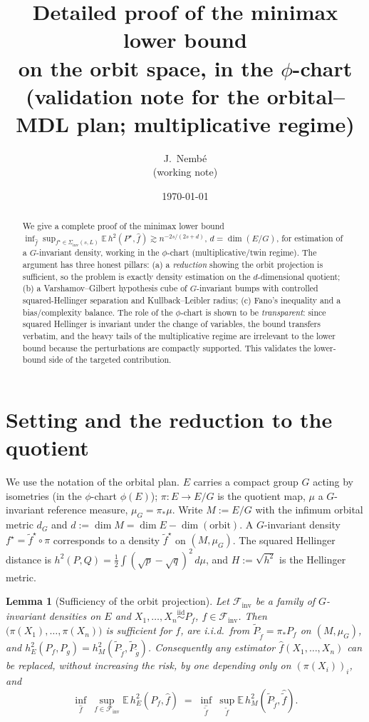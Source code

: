 \documentclass[11pt]{article}
\title{\textbf{Detailed proof of the minimax lower bound\\
on the orbit space, in the $\phi$-chart}\\[0.3em]
\large (validation note for the orbital--MDL plan; multiplicative regime)}
\author{J.~Nemb\'e \\ \small (working note)}
\date{\today}
\theoremstyle{plain}
\newtheorem{lemma}[theorem]{Lemma}
\theoremstyle{definition}
\theoremstyle{remark}
\newcommand{\E}{\mathbb{E}}
\DeclareMathOperator{\dimm}{dim}
\begin{document}
\maketitle

\begin{abstract}
We give a complete proof of the minimax lower bound
$\inf_{\widehat f}\sup_{f^\star\in\Sigma_{\mathrm{inv}}(s,L)}\E\,h^2(P^\star,\widehat f)
\gtrsim n^{-2s/(2s+d)}$, $d=\dimm(E/G)$, for estimation of a $G$-invariant
density, working in the $\phi$-chart (multiplicative/twin regime). The argument
has three honest pillars: (a) a \emph{reduction} showing the orbit projection is
sufficient, so the problem is exactly density estimation on the $d$-dimensional
quotient; (b) a Varshamov--Gilbert hypothesis cube of $G$-invariant bumps with
controlled squared-Hellinger separation and Kullback--Leibler radius; (c) Fano's
inequality and a bias/complexity balance. The role of the $\phi$-chart is shown to
be \emph{transparent}: since squared Hellinger is invariant under the change of
variables, the bound transfers verbatim, and the heavy tails of the multiplicative
regime are irrelevant to the lower bound because the perturbations are compactly
supported. This validates the lower-bound side of the targeted contribution.
\end{abstract}

\section{Setting and the reduction to the quotient}

We use the notation of the orbital plan. $E$ carries a compact group $G$ acting by
isometries (in the $\phi$-chart $\phi(E)$); $\pi:E\to E/G$ is the quotient map,
$\mu$ a $G$-invariant reference measure, $\mu_G=\pi_*\mu$. Write $M:=E/G$ with the
infimum orbital metric $d_G$ and $d:=\dimm M=\dimm E-\dimm(\text{orbit})$. A
$G$-invariant density $f^\star=\tilde f^\star\circ\pi$ corresponds to a density
$\tilde f^\star$ on $(M,\mu_G)$. The squared Hellinger distance is
$h^2(P,Q)=\tfrac12\int(\sqrt{p}-\sqrt{q})^2\,d\mu$, and $H:=\sqrt{h^2}$ is the
Hellinger metric.

\begin{lemma}[Sufficiency of the orbit projection]\label{lem:suff}
Let $\mathcal F_{\mathrm{inv}}$ be a family of $G$-invariant densities on $E$ and
$X_1,\dots,X_n\stackrel{\text{iid}}{\sim}P_{f}$, $f\in\mathcal F_{\mathrm{inv}}$.
Then $\big(\pi(X_1),\dots,\pi(X_n)\big)$ is sufficient for $f$, are i.i.d.\ from
$\tilde P_{\tilde f}=\pi_*P_f$ on $(M,\mu_G)$, and
$h^2_E(P_f,P_g)=h^2_M(\tilde P_{\tilde f},\tilde P_{\tilde g})$. Consequently any
estimator $\widehat f(X_1,\dots,X_n)$ can be replaced, without increasing the
risk, by one depending only on $(\pi(X_i))_i$, and
\[
\inf_{\widehat f}\ \sup_{f\in\mathcal F_{\mathrm{inv}}}\E\,h^2_E(P_f,\widehat f)
\;=\;
\inf_{\widehat{\tilde f}}\ \sup_{\tilde f}\E\,h^2_M(\tilde P_{\tilde f},\widehat{\tilde f}).
\]
\end{lemma}
\end{document}

